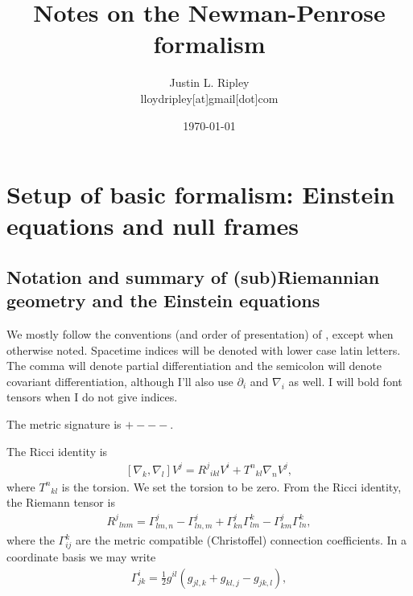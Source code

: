 \documentclass[12pt]{report}
\begin{document}
\title{
{Notes on the Newman-Penrose formalism}\\
}
\author{Justin L. Ripley 
   \\ \small{lloydripley[at]gmail[dot]com}
   }
\date{\today}

\maketitle



\tableofcontents

\chapter{Setup of basic formalism: Einstein equations and null frames}
\label{chptr:NP_formalism}
\section{Notation and summary of (sub)Riemannian geometry and the
Einstein equations}
\label{sec:notation}
	We mostly follow the conventions (and order of presentation) of
\cite{Chandrasekhar_bh_book}, except when otherwise noted.
Spacetime indices will be denoted with lower case latin letters. The comma will denote
partial differentiation and the semicolon will denote covariant differentiation,
although I'll also use $\partial_i$ and $\nabla_i$ as well. I will bold font
tensors when I do not give indices.

	The metric signature is $+---$.

	The Ricci identity is
\begin{align}
	\left[\nabla_k,\nabla_l\right]V^j
	=	
	R^j{}_{ikl}V^i
+
	T^n{}_{kl}\nabla_nV^j
	,
\end{align}
	where $T^n{}_{kl}$ is the torsion. We set the torsion to be zero.
	From the Ricci identity, the Riemann tensor is
\begin{align}
	R^j{}_{lnm}
	=
	\Gamma^j_{lm,n}
-	\Gamma^j_{ln,m}
+	\Gamma^j_{kn}\Gamma^k_{lm}
-	\Gamma^j_{km}\Gamma^k_{ln}
	,
\end{align}
	where the $\Gamma^k_{ij}$ are the metric compatible (Christoffel)
connection coefficients. In a coordinate basis we may write 
\begin{align}
	\Gamma^i_{jk}
	=
	\frac{1}{2}g^{il}\left(
		g_{jl,k}
	+	g_{kl,j}
	-	g_{jk,l}
	\right)
	,
\end{align}
\end{document}

